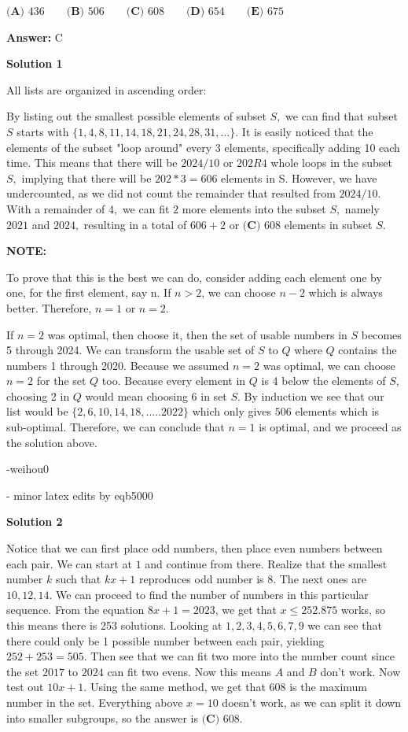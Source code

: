 \begin{enumerate}
 $\textbf{(A) }436 \qquad \textbf{(B) }506 \qquad \textbf{(C) }608 \qquad \textbf{(D) }654 \qquad \textbf{(E) }675$

 \textbf{Answer: }C



\textbf{Solution 1}

All lists are organized in ascending order:

 By listing out the smallest possible elements of subset $S,$ we can find that subset $S$ starts with $\{1, 4, 8, 11, 14, 18, 21, 24, 28, 31, \dots\}.$ It is easily noticed that the elements of the subset "loop around" every 3 elements, specifically adding 10 each time. This means that there will be $2024/10$ or $202R4$ whole loops in the subset $S,$ implying that there will be $202*3 = 606$ elements in S. However, we have undercounted, as we did not count the remainder that resulted from $2024/10$$.$ With a remainder of $4,$ we can fit $2$ more elements into the subset $S,$ namely $2021$ and $2024,$ resulting in a total of $606+2$ or $\boxed{\textbf{(C) }608}$ elements in subset $S$.

 
\textbf{NOTE:}

 To prove that this is the best we can do, consider adding each element one by one, for the first element, say n. If $n>2$, we can choose $n - 2$ which is always better. Therefore, $n = 1$ or $n = 2.$ 

 If $n = 2$ was optimal, then choose it, then the set of usable numbers in $S$ becomes 5 through 2024. We can transform the usable set of $S$ to $Q$ where $Q$ contains the numbers 1 through 2020. Because we assumed $n = 2$ was optimal, we can choose $n = 2$ for the set $Q$ too. Because every element in $Q$ is 4 below the elements of $S$, choosing 2 in $Q$ would mean choosing 6 in set $S$. By induction we see that our list would be $\{2,6,10,14,18,.....2022\}$ which only gives $506$ elements which is sub-optimal. Therefore, we can conclude that $n = 1$ is optimal, and we proceed as the solution above.

 -weihou0

 - minor latex edits by eqb5000

 



\textbf{Solution 2}

Notice that we can first place odd numbers, then place even numbers between each pair. We can start at $1$ and continue from there. Realize that the smallest number $k$ such that $kx+1$ reproduces odd number is $8$. The next ones are $10, 12, 14$. We can proceed to find the number of numbers in this particular sequence. From the equation $8x+1=2023$, we get that $x \leq 252.875$ works, so this means there is 253 solutions. Looking at $1,2,3,4,5,6,7,9$ we can see that there could only be 1 possible number between each pair, yielding $252+253=505$. Then see that we can fit two more into the number count since the set $2017$ to $2024$ can fit two evens. Now this means $A$ and $B$ don’t work. Now test out $10x+1$. Using the same method, we get that $608$ is the maximum number in the set. Everything above $x=10$ doesn’t work, as we can split it down into smaller subgroups, so the answer is $\boxed{\textbf{(C) }608}$.


\end{enumerate}
